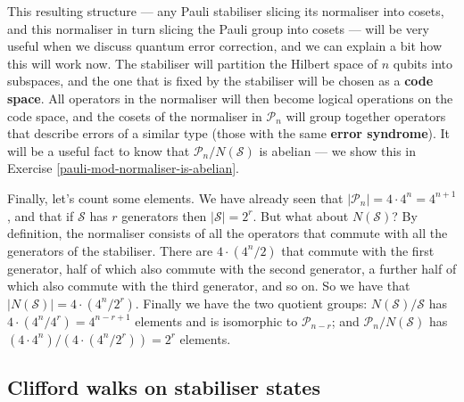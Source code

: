 \documentclass[fleqn]{article}
\begin{document}
This resulting structure --- any Pauli stabiliser slicing its normaliser into cosets, and this normaliser in turn slicing the Pauli group into cosets --- will be very useful when we discuss quantum error correction, and we can explain a bit how this will work now.
The stabiliser will partition the Hilbert space of \(n\) qubits into subspaces, and the one that is fixed by the stabiliser will be chosen as a \textbf{code space}.
All operators in the normaliser will then become logical operations on the code space, and the cosets of the normaliser in \(\mathcal{P}_n\) will group together operators that describe errors of a similar type (those with the same \textbf{error syndrome}).
It will be a useful fact to know that \(\mathcal{P}_n/N(\mathcal{S})\) is abelian --- we show this in Exercise \ref{pauli-mod-normaliser-is-abelian}.

Finally, let's count some elements.
We have already seen that \(|\mathcal{P}_n|=4\cdot 4^n=4^{n+1}\), and that if \(\mathcal{S}\) has \(r\) generators then \(|\mathcal{S}|=2^r\).
But what about \(N(\mathcal{S})\)?
By definition, the normaliser consists of all the operators that commute with all the generators of the stabiliser.
There are \(4\cdot(4^n/2)\) that commute with the first generator, half of which also commute with the second generator, a further half of which also commute with the third generator, and so on.
So we have that \(|N(\mathcal{S})|=4\cdot(4^n/2^r)\).
Finally we have the two quotient groups: \(N(\mathcal{S})/\mathcal{S}\) has \(4\cdot(4^n/4^r)=4^{n-r+1}\) elements and is isomorphic to \(\mathcal{P}_{n-r}\); and \(\mathcal{P}_n/N(\mathcal{S})\) has \((4\cdot4^n)/(4\cdot(4^n/2^r))=2^r\) elements.

\hypertarget{clifford-walks-on-stabiliser-states}{%
\subsection{Clifford walks on stabiliser states}\label{clifford-walks-on-stabiliser-states}}
\end{document}
